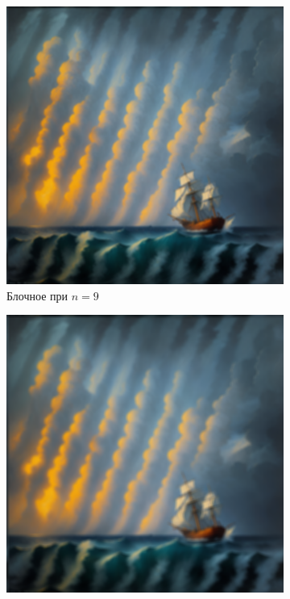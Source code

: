\documentclass[a4paper, 12pt]{article}
\begin{document}
    \begin{figure}[H]
        \centering
        \begin{subfigure}{0.30\textwidth}
            \centering
            \includegraphics[width=\linewidth]{bl_fft2_n=9.png}
            \caption{Блочное при $n=9$}
            \label{fig:bl_fft2_n=9}
        \end{subfigure}
        \begin{subfigure}{0.30\textwidth}
            \centering
            \includegraphics[width=\linewidth]{bl_fft2_n=13.png}

\end{subfigure}
\end{figure}
\end{document}
